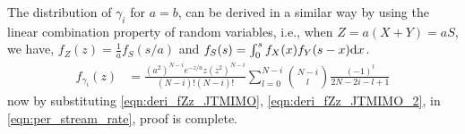 The distribution of $\gamma_{i}$ for $a=b$, can be derived in a similar way by using the linear combination property of random variables, i.e., when  $Z=a (X+ Y)=a S$, we have, 
$f_Z(z) = \frac{1}{a} f_S(s/a)$ and $f_S(s) = \int_{0}^{s} f_X(x) f_Y(s-x) \mathrm{d} x$. 
\begin{align}\label{eqn:deri_fZz_JTMIMO_2}
    f_{\gamma_{i}}(z) &= \frac{(a^2)^{N-i}e^{-z/a}z(z^2)^{N-i}}{(N-i)!(N-i)!}\sum_{l=0}^{N-i} {N-i \choose l}\frac{(-1)^{l}}{2N-2i-l+1}
\end{align}
now by substituting \eqref{eqn:deri_fZz_JTMIMO}, \eqref{eqn:deri_fZz_JTMIMO_2}, in \eqref{eqn:per_stream_rate}, proof is complete.







